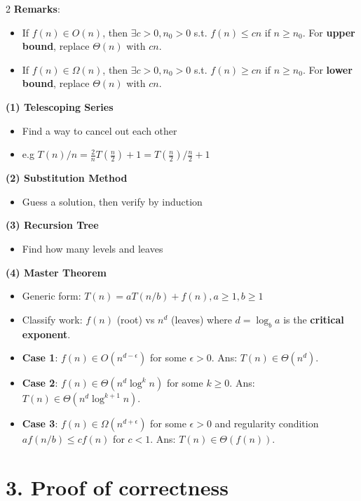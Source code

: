 \documentclass[10pt,landscape]{article}
\begin{document}
\begin{multicols*}{2}
\textbf{Remarks}:
\begin{itemize}
    \item If $f(n) \in O(n)$, then $\exists c > 0, n_0 > 0$ s.t. $f(n) \leq cn$ if $n \geq n_0$. For \textbf{upper bound}, replace $\Theta(n)$ with $cn$.
    \item If $f(n) \in \Omega(n)$, then $\exists c > 0, n_0 > 0$ s.t. $f(n) \geq cn$ if $n \geq n_0$. For \textbf{lower bound}, replace $\Theta(n)$ with $cn$.
\end{itemize}
\vspace{8pt}
\textbf{(1) Telescoping Series}
\begin{itemize}
    \item Find a way to cancel out each other
    \item e.g $T(n)/n = \frac{2}{n}T(\frac{n}{2}) + 1 = T(\frac{n}{2})/\frac{n}{2} + 1$ 
\end{itemize}
\vspace{8pt}
\textbf{(2) Substitution Method}
\begin{itemize}
    \item Guess a solution, then verify by induction
\end{itemize}
\vspace{8pt}
\textbf{(3) Recursion Tree}
\begin{itemize}
    \item Find how many levels and leaves
\end{itemize}
\vspace{8pt}
\textbf{(4) Master Theorem}
\begin{itemize}
    \item Generic form: $T(n) = aT(n / b) + f(n), a \geq 1, b \geq 1$
    \item Classify work: $f(n)$ (root) vs $n^d$ (leaves) where $d = \log_b a$ is the \textbf{critical exponent}.
    \item \textbf{Case 1}: $f(n) \in O(n^{d-\epsilon})$ for some $\epsilon > 0$. Ans: $T(n) \in \Theta(n^d)$.
    \item \textbf{Case 2}: $f(n) \in \Theta(n^d \log^k n)$ for some $k \geq 0$. Ans: $T(n) \in \Theta(n^d \log^{k+1} n)$.
    \item \textbf{Case 3}: $f(n) \in \Omega(n^{d+\epsilon})$ for some $\epsilon > 0$ and regularity condition $af(n/b) \leq cf(n)$ for $c < 1$. Ans: $T(n) \in \Theta(f(n))$.
\end{itemize}

\hrulefill

\section*{3. Proof of correctness}


\end{multicols*}
\end{document}
